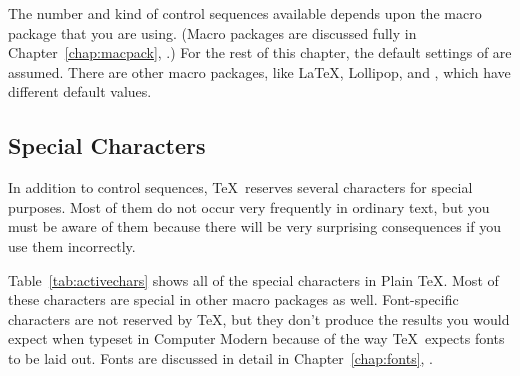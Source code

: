 The number and kind of control sequences available depends upon the
macro package that you are using. (Macro packages are discussed fully
in Chapter~\ref{chap:macpack}, {\it {}}.)  For the
rest of this chapter, the default settings of  are
assumed.  There are other macro packages, like \LaTeX,
Lollipop, and \TeXinfo, which have different default values.

\subsection{Special Characters}

In addition to control sequences, \TeX\ reserves several characters
 for special purposes.  Most 
of them do not occur very frequently in
ordinary text, but you must be aware of them because there will be
very surprising consequences if you use them incorrectly.

Table~\ref{tab:activechars} shows all of the special characters in
Plain \TeX.  Most of these 
characters are special in other macro
packages as well.  Font-specific characters are not reserved by \TeX,
but they don't produce the results you would expect when typeset in
Computer Modern because of the way \TeX\ expects fonts to be laid out.
Fonts are discussed in detail in Chapter~\ref{chap:fonts}, {\it
{}}.


